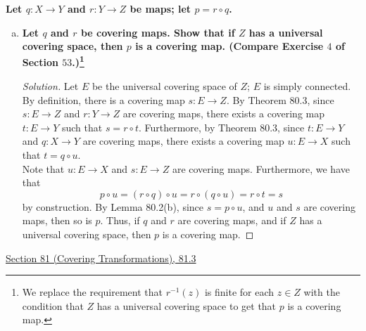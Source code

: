 \documentclass[11pt]{article}
\newenvironment{solution}
  {\renewcommand\qedsymbol{$\blacksquare$}\begin{proof}[Solution]}
  {\end{proof}}
\begin{document}
\textbf{Let $q\colon X \rightarrow Y$ and $r\colon Y \rightarrow Z$ be maps; let $p = r \circ q$.}
\begin{enumerate}[a)]
    \item \textbf{Let $q$ and $r$ be covering maps. Show that if $Z$ has a universal covering space, then $p$ is a covering map. (Compare Exercise $4$ of Section $53$.)\footnote{
    We replace the requirement that $r^{-1}(z)$ is finite for each $z \in Z$ with the condition that $Z$ has a universal covering space to get that $p$ is a covering map.}}
    \begin{solution}
    
    Let $E$ be the universal covering space of $Z$; $E$ is simply connected. By definition, there is a covering map $s \colon E \rightarrow Z$. 
    By Theorem 80.3, since $s \colon E \rightarrow Z$ and $r \colon Y \rightarrow Z$ are covering maps, there exists a covering map $t \colon E \rightarrow Y$ such that $s = r \circ t$. 
    Furthermore, by Theorem 80.3, since $t \colon E \rightarrow Y$ and $q \colon X \rightarrow Y$ are covering maps, there exists a covering map $u\colon E \rightarrow X$ such that $t = q \circ u$. \\

    Note that $u \colon E \rightarrow X$ and $s \colon E \rightarrow Z$ are covering maps. Furthermore, we have that
    \[
        p \circ u = (r \circ q) \circ u = r \circ (q \circ u) = r \circ t = s
    \]
    by construction. By Lemma 80.2(b), since $s = p \circ u$, and $u$ and $s$ are covering maps, then so is $p$. 
    Thus, if $q$ and $r$ are covering maps, and if $Z$ has a universal covering space, then $p$ is a covering map.
    \end{solution}
\end{enumerate}

\newpage

\underline{Section 81 (Covering Transformations), 81.3} \\
\end{document}
